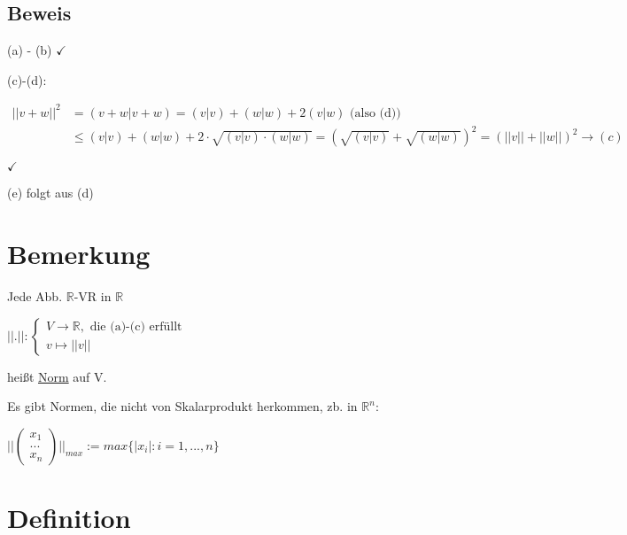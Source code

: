 \documentclass[a4paper, openany]{book}
\begin{document}
        \subsection{Beweis}

        (a) - (b) $\checkmark$

        \par \medskip

        (c)-(d):

        \begin{align*}
        ||v+w||^2 &= (v+w|v+w) = (v|v) + (w|w) + 2(v|w) \text{ (also (d))} \\
                  & \le (v|v) + (w|w) + 2 \cdot \sqrt{(v|v) \cdot (w|w)} = (\sqrt{(v|v)} + \sqrt{(w|w)})^2 = (||v|| + ||w||)^2 \rightarrow (c)
        \end{align*}

        $\checkmark$

        (e) folgt aus (d)

        \section{Bemerkung}

        Jede Abb. $\mathbb{R}$-VR in $\mathbb{R}$

        \begin{center}
          $||.|| : \begin{cases} V \rightarrow \mathbb{R}, \text{ die (a)-(c) erfüllt} \\ v \mapsto ||v|| \end{cases}$
        \end{center}

        heißt \underline{Norm} auf V. 

        \par \medskip

        Es gibt Normen, die nicht von Skalarprodukt herkommen, zb. in $\mathbb{R}^n$:

        \begin{center}
          $||\begin{pmatrix}x_1 \\ ... \\ x_n \end{pmatrix} ||_{max} := max \{|x_i| : i=1,...,n \}$
        \end{center}

        \section{Definition}
\end{document}
